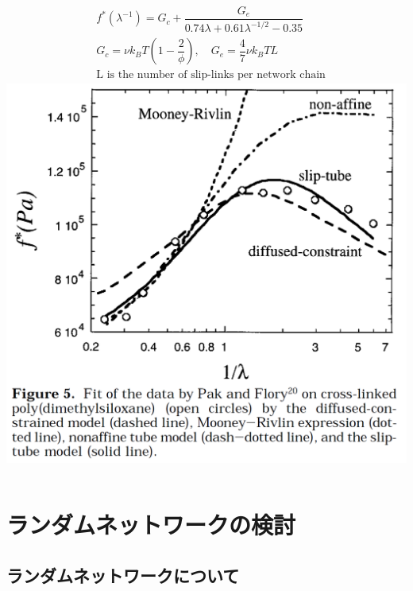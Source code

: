 \documentclass[12pt, dvipdfmx]{beamer}
\begin{document}
\begin{frame}
			\begin{columns}[totalwidth=1\textwidth]
				\scriptsize
				\begin{align*}
					&f^*(\lambda^{-1}) = G_c + \dfrac{G_e}{0.74 \lambda + 0.61 \lambda^{-1/2} - 0.35} \\
					&G_c = \nu k_B T \left(1-\dfrac{2}{\phi} \right), \quad G_e = \dfrac{4}{7} \nu k_B T L \\
					& \text{L is the number of slip-links per network chain}
				\end{align*}
				\includegraphics[width=.9\textwidth]{NW_model_rubinstein.png}
			\end{columns}
\end{frame}

\section{ランダムネットワークの検討}
\subsection{ランダムネットワークについて}
\end{document}
